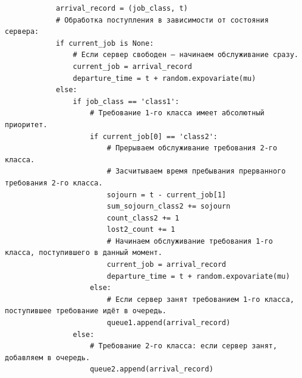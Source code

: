 \documentclass[otchet]{SCWorks}
\begin{document}
\begin{verbatim}
            arrival_record = (job_class, t)
            # Обработка поступления в зависимости от состояния сервера:
            if current_job is None:
                # Если сервер свободен – начинаем обслуживание сразу.
                current_job = arrival_record
                departure_time = t + random.expovariate(mu)
            else:
                if job_class == 'class1':
                    # Требование 1-го класса имеет абсолютный приоритет.
                    if current_job[0] == 'class2':
                        # Прерываем обслуживание требования 2-го класса.
                        # Засчитываем время пребывания прерванного требования 2-го класса.
                        sojourn = t - current_job[1]
                        sum_sojourn_class2 += sojourn
                        count_class2 += 1
                        lost2_count += 1
                        # Начинаем обслуживание требования 1-го класса, поступившего в данный момент.
                        current_job = arrival_record
                        departure_time = t + random.expovariate(mu)
                    else:
                        # Если сервер занят требованием 1-го класса, поступившее требование идёт в очередь.
                        queue1.append(arrival_record)
                else:
                    # Требование 2-го класса: если сервер занят, добавляем в очередь.
                    queue2.append(arrival_record)
    

\end{verbatim}
\end{document}
